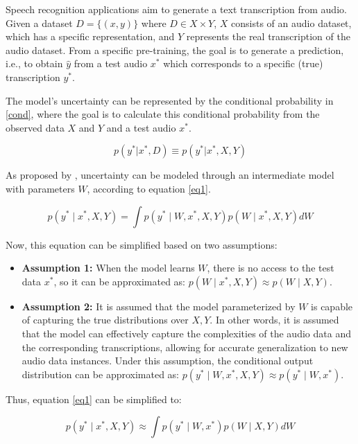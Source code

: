 
Speech recognition applications aim to generate a text transcription from audio. Given a dataset $D = \{(x, y)\}$ where $D \in X \times Y$, $X$ consists of an audio dataset, which has a specific representation, and $Y$ represents the real transcription of the audio dataset. From a specific pre-training, the goal is to generate a prediction, i.e., to obtain $\hat{y}$ from a test audio $x^{*}$ which corresponds to a specific (true) transcription $y^{*}$.

The model’s uncertainty can be represented by the conditional probability in \eqref{cond}, where the goal is to calculate this conditional probability from the observed data $X$ and $Y$ and a test audio $x^{*}$.

\begin{equation}  \label{cond}
   p(y^* | x^*, D) \equiv p(y^* | x^*, X, Y)
\end{equation}

As proposed by \cite{mena2021survey}, uncertainty can be modeled through an intermediate model with parameters $W$, according to equation \ref{eq1}.

\begin{equation}  \label{eq1}
   p(y^* \mid x^{*}, X, Y) = \int p(y^{*} \mid W, x^{*}, X, Y) p(W \mid x^{*}, X, Y)  dW
\end{equation}

Now, this equation can be simplified based on two assumptions:

\begin{itemize}
   \item \textbf{Assumption 1:} When the model learns $W$, there is no access to the test data $x^{*}$, so it can be approximated as: $ p(W \mid x^*,X,Y) \approx p(W \mid X,Y) $.
   \item \textbf{Assumption 2:} It is assumed that the model parameterized by $W$ is capable of capturing the true distributions over $X, Y$. In other words, it is assumed that the model can effectively capture the complexities of the audio data and the corresponding transcriptions, allowing for accurate generalization to new audio data instances. Under this assumption, the conditional output distribution can be approximated as:  $p(y^{*} \mid W, x^{*}, X, Y)  \approx  p(y^{*} \mid W, x^{*})$.
\end{itemize}

Thus, equation \ref{eq1} can be simplified to:

\begin{equation}  \label{eq2}
   p(y^{*} \mid x^{*}, X, Y) \approx \int p(y^{*} \mid W, x^{*})  p(W \mid X, Y) dW
\end{equation}







